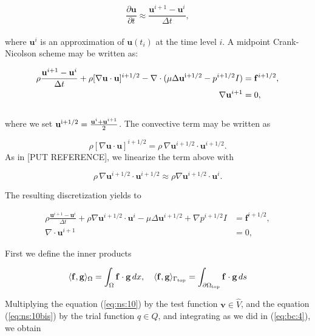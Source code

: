 \documentclass[a4paper,11pt,openright,twoside]{book}
\begin{document}
\begin{equation}
\frac{\partial \mathbf{u}}{\partial t} \approx \frac{\mathbf{u}^{i+1} -\mathbf{u}^i }{\Delta t},
\end{equation}
\\
where $\mathbf{u}^i$ is an approximation of $\mathbf{u}(t_i)$ at the time level $i$. A midpoint Crank-Nicolson scheme may be written as:

\begin{align}
\rho \frac{\mathbf{u}^{i+1} - \mathbf{u}^i}{\Delta t} + \rho [\nabla \mathbf{u} \cdot \mathbf{u}]^{i+1/2} - \nabla \cdot (\mu \Delta \mathbf{u}^{\rm  i+1/2} - p^{i+1/2}I) &= \mathbf{f}^{i+1/2}, \\
\nabla \mathbf{u}^{i+1} &= 0,
\end{align}
\\
where we set $\mathbf{u}^{\rm i+1/2} = \frac{\mathbf{u}^i + \mathbf{u}^{i+1}}{2}$.
The convective term may be written as

\begin{equation}
\rho [\nabla \mathbf{u} \cdot \mathbf{u}]^{i+1/2} = \rho \, \nabla \mathbf{u}^{i+1/2} \cdot \mathbf{u}^{i+1/2}.
\end{equation}
As in [PUT REFERENCE], we linearize the term above with

\begin{equation}
\rho \, \nabla \mathbf{u}^{i+1/2} \cdot \mathbf{u}^{i+1/2} \approx \rho \nabla \mathbf{u}^{i+1/2} \cdot \mathbf{u}^i.
\end{equation}

The resulting discretization yields to

\begin{align}
\label{eq:ns:10}
\rho \frac{\mathbf{u}^{i+1} - \mathbf{u}^i}{\Delta t} + \rho \nabla \mathbf{u}^{i+1/2} \cdot \mathbf{u}^i - \mu \Delta \mathbf{u}^{i+1/2} + \nabla p^{i+1/2}I &= \mathbf{f}^{i+1/2}, \\
\label{eq:ns:10bis}
\nabla \cdot \mathbf{u}^{i+1} &= 0,
\end{align}

First we define the inner products

\[
\langle \mathbf{f}, \mathbf{g} \rangle_\Omega = \int_\Omega \mathbf{f} \cdot \mathbf{g} \, dx, \quad
\langle \mathbf{f}, \mathbf{g} \rangle_{\Gamma_{\rm top}} = \int_{\partial \Omega_{\rm top}} \mathbf{f} \cdot \mathbf{g} \, ds
\]

Multiplying the equation (\ref{eq:ns:10}) by the test function $\mathbf{v} \in \hat{V}$, and the equation (\ref{eq:ns:10bis}) by the trial function $q \in Q$, and integrating as we did in (\ref{eq:bc:4}), we obtain 
\end{document}
